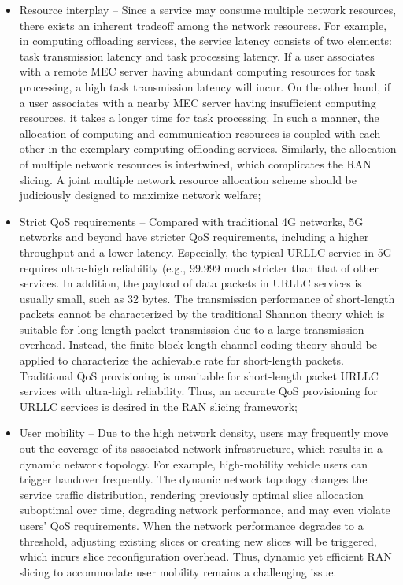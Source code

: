 \documentclass[conference]{IEEEtran}
\begin{document}
\begin{itemize}
\item 
Resource interplay – Since a service may consume multiple network resources, there exists an inherent tradeoff
among the network resources. For example, in computing offloading services, the service latency consists of
two elements: task transmission latency and task processing latency. If a user associates with a remote MEC
server having abundant computing resources for task
processing, a high task transmission latency will incur.
On the other hand, if a user associates with a nearby
MEC server having insufficient computing resources, it
takes a longer time for task processing. In such a manner, the allocation of computing and communication resources is coupled with each other in the exemplary computing offloading services. Similarly, the allocation of
multiple network resources is intertwined, which complicates the RAN slicing. A joint multiple network resource allocation scheme should be judiciously designed
to maximize network welfare; 
\item  Strict QoS requirements – Compared with traditional 4G
networks, 5G networks and beyond have stricter QoS
requirements, including a higher throughput and a lower
latency. Especially, the typical URLLC service in 5G
requires ultra-high reliability (e.g., 99.999%
much stricter than that of other services. In addition, the
payload of data packets in URLLC services is usually
small, such as 32 bytes. The transmission performance of short-length packets cannot be characterized
by the traditional Shannon theory which is suitable for
long-length packet transmission due to a large transmission overhead. Instead, the finite block length channel coding theory should be applied to characterize the
achievable rate for short-length packets. Traditional
QoS provisioning is unsuitable for short-length packet
URLLC services with ultra-high reliability. Thus, an accurate QoS provisioning for URLLC services is desired
in the RAN slicing framework; 
\item  User mobility – Due to the high network density, users
may frequently move out the coverage of its associated network infrastructure, which results in a dynamic
network topology. For example, high-mobility vehicle
users can trigger handover frequently. The dynamic network topology changes the service traffic distribution,
rendering previously optimal slice allocation suboptimal
over time, degrading network performance, and may
even violate users’ QoS requirements. When the network
performance degrades to a threshold, adjusting existing
slices or creating new slices will be triggered, which
incurs slice reconfiguration overhead. Thus, dynamic yet
efficient RAN slicing to accommodate user mobility remains a challenging issue.\cite{aiNS}
\end{itemize}
\end{document}
